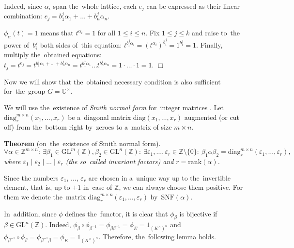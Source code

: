\documentclass[twoside]{article}
\begin{document}
    Indeed, since $\alpha_i$ span the~whole lattice, each $e_j$ can be expressed as their linear combination:
    $
        e_j = b^j_1 \alpha_1 + \ldots + b^j_n \alpha_n.
    $

    $\phi_\alpha(t) = 1$ means that $t^{\alpha_i} = 1$ for all $1 \leq i \leq n$.
    Fix $1 \leq j \leq k$ and raise to~the power of~$b^j_i$ both sides of~this equation:
    $t^{b^j_i \alpha_i} = (t^{\alpha_i})^{b^j_i} = 1^{b^j_i} = 1$.
    Finally, multiply the~obtained equations:
    $
        t_j = t^{e_j} = t^{b^j_1 \alpha_1 + \ldots + b^j_n \alpha_n} = t^{b^j_1 \alpha_1} \ldots t^{b^j_n \alpha_n} = 1 \cdot \ldots \cdot 1 = 1.
    $
\hfill$\Box$\medskip

Now we will show that the~obtained necessary condition is also sufficient for~the~group $G = {\mathbb{C}^\times}$.

We will use the~existence of \textit{Smith normal form} for~integer matrices \cite{Smth60}.
Let $\mathrm{diag}^{m \times n}_r(x_1,\allowbreak \ldots,\allowbreak x_r)$ be a~diagonal matrix $\mathrm{diag}(x_1,\allowbreak \ldots,\allowbreak x_r)$
augmented (or cut off) from the~bottom right by~zeroes to a~matrix of size $m \times n$.

\medskip\noindent\textbf{Theorem} (on~the~existence of Smith normal form).\emph{
    $$
        \forall \alpha \in \mathbb{Z}^{m \times n}{:}\
        \exists \beta_1 \in \mathrm{GL}^m(\mathbb{Z}), \beta_2 \in \mathrm{GL}^n(\mathbb{Z}){:} \
        \exists \varepsilon_1, \ldots, \varepsilon_r \in \mathbb{Z} \setminus \{0\}{:} \
        \beta_1 \alpha \beta_2 = \mathrm{diag}^{m \times n}_r(\varepsilon_1, \ldots, \varepsilon_r),
    $$
    where $\varepsilon_1 \mid \varepsilon_2 \mid \ldots \mid \varepsilon_r$ (the so~called invariant factors) and $r = \mathrm{rank}(\alpha)$.
}\medskip

Since the numbers $\varepsilon_1$, $\ldots$, $\varepsilon_r$ are chosen in a~unique way up to the~invertible element,
that is, up to $\pm 1$ in~case of $\mathbb{Z}$, we can always choose them positive. For them we denote
the~matrix $\mathrm{diag}^{m \times n}_r(\varepsilon_1, \ldots, \varepsilon_r)$ by~$\mathrm{SNF}(\alpha)$.

In~addition, since $\phi$ defines the~functor, it is clear that $\phi_\beta$ is bijective if $\beta \in \mathrm{GL}^n(\mathbb{Z})$.
Indeed, $\phi_\beta \circ \phi_{\beta^{-1}} = \phi_{\beta \beta^{-1}} = \phi_E = 1_{(K^\times)^n}$
and $\phi_{\beta^{-1}} \circ \phi_\beta = \phi_{\beta^{-1} \beta} = \phi_E = 1_{(K^\times)^n}$. Therefore,
the~following lemma holds.
\end{document}
